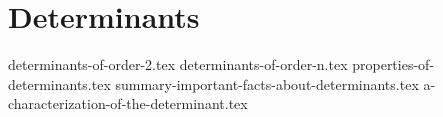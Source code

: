 \chapter{Determinants}
{determinants-of-order-2.tex}
{determinants-of-order-n.tex}
{properties-of-determinants.tex}
{summary-important-facts-about-determinants.tex}
{a-characterization-of-the-determinant.tex}
